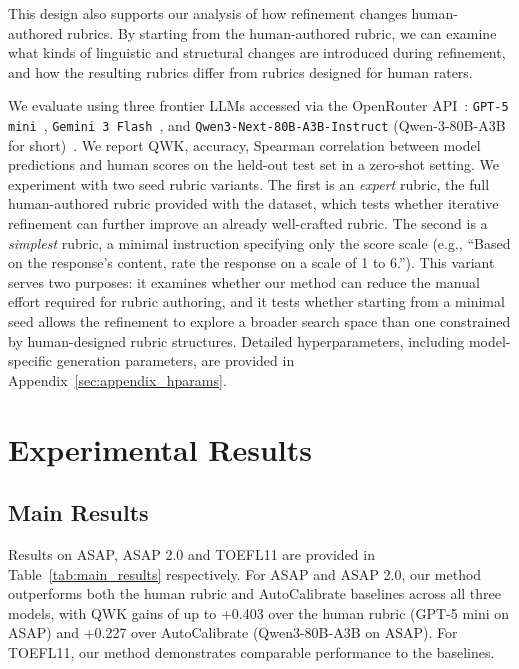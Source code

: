\documentclass[11pt]{article}
\begin{document}
This design also supports our analysis of how refinement changes human-authored rubrics. By starting from the human-authored rubric, we can examine what kinds of linguistic and structural changes are introduced during refinement, and how the resulting rubrics differ from rubrics designed for human raters.

We evaluate using three frontier LLMs accessed via the OpenRouter API~\citep{openrouter}: \texttt{GPT-5 mini}~\citep{gpt5}, \texttt{Gemini~3~Flash}~\citep{Google2025GeminiFlash}, and \texttt{Qwen3-Next-80B-A3B-Instruct} (Qwen-3-80B-A3B for short)~\citep{qwen3-next}. 
We report QWK, accuracy, Spearman correlation between model predictions and human scores on the held-out test set in a zero-shot setting. We experiment with two seed rubric variants. The first is an \textit{expert} rubric, the full human-authored rubric provided with the dataset, which tests whether iterative refinement can further improve an already well-crafted rubric. The second is a \textit{simplest} rubric, a minimal instruction specifying only the score scale (e.g., ``Based on the response's content, rate the response on a scale of 1 to 6.''). This variant serves two purposes: it examines whether our method can reduce the manual effort required for rubric authoring, and it tests whether starting from a minimal seed allows the refinement to explore a broader search space than one constrained by human-designed rubric structures. Detailed hyperparameters, including model-specific generation parameters, are provided in Appendix~\ref{sec:appendix_hparams}.

\section{Experimental Results}
\label{sec:results}

\subsection{Main Results}
\label{sec:main_results}
Results on ASAP, ASAP 2.0 and TOEFL11 are provided in Table~\ref{tab:main_results} respectively. For ASAP and ASAP 2.0, our method outperforms both the human rubric and AutoCalibrate baselines across all three models, with QWK gains of up to +0.403 over the human rubric (GPT-5 mini on ASAP) and +0.227 over AutoCalibrate (Qwen3-80B-A3B on ASAP). For TOEFL11, our method demonstrates comparable performance to the baselines.
\end{document}

